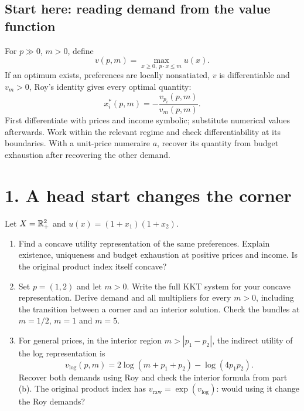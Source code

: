 \subsection*{Start here: reading demand from the value function}
For $p\gg0$, $m>0$, define
\[
 v(p,m)=\max_{x\ge0,\ p\cdot x\le m}u(x).
\]
If an optimum exists, preferences are locally nonsatiated, $v$ is differentiable and $v_m>0$, Roy's identity gives every optimal quantity:
\[
 x_i^*(p,m)=-\frac{v_{p_i}(p,m)}{v_m(p,m)}.
\]
First differentiate with prices and income symbolic; substitute numerical values afterwards. Work within the relevant regime and check differentiability at its boundaries. With a unit-price numeraire $a$, recover its quantity from budget exhaustion after recovering the other demand.
\section*{1. A head start changes the corner}
Let $X=\mathbb R_+^2$ and $u(x)=(1+x_1)(1+x_2)$.
\begin{enumerate}[label=(\alph*)]
\item Find a concave utility representation of the same preferences. Explain existence, uniqueness and budget exhaustion at positive prices and income. Is the original product index itself concave?
\item Set $p=(1,2)$ and let $m>0$. Write the full KKT system for your concave representation. Derive demand and all multipliers for every $m>0$, including the transition between a corner and an interior solution. Check the bundles at $m=1/2$, $m=1$ and $m=5$.
\item For general prices, in the interior region $m>|p_1-p_2|$, the indirect utility of the log representation is
\[
 v_{\log}(p,m)=2\log(m+p_1+p_2)-\log(4p_1p_2).
\]
Recover both demands using Roy and check the interior formula from part (b). The original product index has $v_{\mathrm{raw}}=\exp(v_{\log})$: would using it change the Roy demands?
\end{enumerate}
\clearpage
